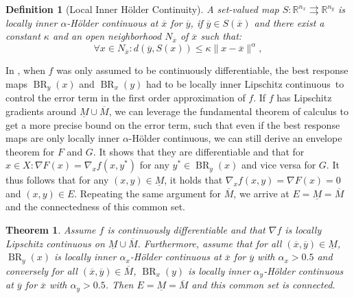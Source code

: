\documentclass{article}
\newtheorem{theorem}{Theorem}
\newtheorem{definition}{Definition}[section]
\newcommand{\R}{\mathbb{R}}
\newcommand{\lilc}{locally inner Lipschitz continuous}
\DeclareMathOperator{\BR}{BR}
\begin{document}
\begin{definition}[Local Inner Hölder Continuity]
    \label{def:localholder}
    A set-valued map $S:\R^{n_x} \rightrightarrows \R^{n_y}$ is locally inner $\alpha$-Hölder continuous at $\overline{x}$ for $\overline{y}$, if $\overline{y}\in S(\overline{x})$ and there exist a constant $\kappa$ and an open neighborhood $N_{\overline{x}}$ of $\overline{x}$ such that:
    \[
    \forall x \in N_{\overline{x}}: d(\overline{y},S(x)) \leq \kappa \|x-\overline{x}\|^\alpha,
    \]
    
\end{definition}

In , when $f$ was only assumed to be continuously differentiable, the best response maps $\BR_y(x)$ and $\BR_x(y)$ had to be \lilc\ to control the error term in the first order approximation of $f$. If $f$ has Lipschitz gradients around $\underline{M}\cup\overline{M}$, we can leverage the fundamental theorem of calculus to get a more precise bound on the error term, such that even if the best response maps are only locally inner $\alpha$-Hölder continuous, we can still derive an envelope theorem for $F$ and $G$. It shows that they are differentiable and that for $x\in X:\nabla F(x)=\nabla_x f(x,y^*)$ for any $y^*\in \BR_y(x)$ and vice versa for $G$. It thus follows that for any $(x,y)\in \underline{M}$, it holds that $\nabla_x f(x,y)=\nabla F(x)=0$ and $(x,y)\in E$. Repeating the same argument for $\overline{M}$, we arrive at $E=\underline{M}=\overline{M}$ and the connectedness of this common set.


\begin{theorem}
\label{thm:Holderconnected}
Assume $f$ is continuously differentiable and that $\nabla f$ is locally Lipschitz continuous on $\underline{M}\cup\overline{M}$. Furthermore, assume that for all $(\overline{x},\overline{y})\in \underline{M}$, $\BR_y(x)$ is locally inner $\alpha_x$-Hölder continuous at $\overline{x}$ for $\overline{y}$ with $\alpha_x>0.5$ and conversely for all $(\overline{x},\overline{y})\in \overline{M}$, $\BR_x(y)$ is locally inner $\alpha_y$-Hölder continuous at $\overline{y}$ for $\overline{x}$ with $\alpha_y>0.5$. Then $E=\underline{M}=\overline{M}$ and this common set is connected.
\end{theorem}
\end{document}
